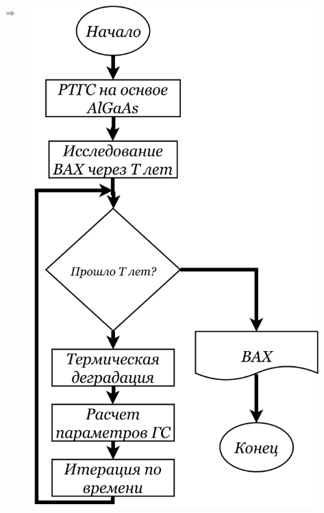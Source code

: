 \documentclass[10pt,pdf,hyperref={unicode},aspectratio={169}]{beamer}
\begin{document}
\begin{frame}
\begin{columns}
\begin{center}
		\end{center}
		\Huge{$\Rightarrow$}
		\begin{center}
			\includegraphics[width=0.95\textwidth]{assets/Cond}
		\end{center}
	\end{columns}
\end{frame}
\end{document}
